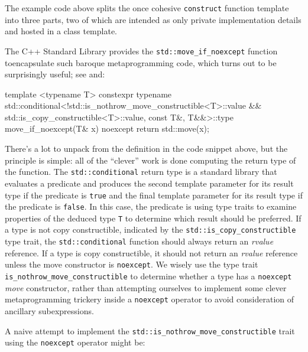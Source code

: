 \noindent The example code above splits the once cohesive \lstinline!construct!
function template into three parts, two of which are intended as only
private implementation details and hosted in a class template.

The C++ Standard Library provides the \lstinline!std::move_if_noexcept!
function to\linebreak[4] encapsulate such baroque metaprogramming code, which turns
out to be surprisingly useful; see  and\linebreak[4]
:

\begin{emcppslisting}
template <typename T>
constexpr
typename std::conditional<!std::is_nothrow_move_constructible<T>::value
                          && std::is_copy_constructible<T>::value,
                          const T&,
                          T&&>::type
move_if_noexcept(T& x) noexcept
{
    return std::move(x);
}
\end{emcppslisting}
    

\noindent There's a lot to unpack from the definition in the code snippet above,
but the principle is simple: all of the ``clever'' work is done
computing the return type of the function. The \lstinline!std::conditional!
return type is a standard library  that evaluates a
predicate and produces the second template parameter for its result type
if the predicate is \lstinline!true! and the final template parameter for
its result type if the predicate is \lstinline!false!. In this case, the
predicate is using type traits to examine properties of the deduced type
\lstinline!T! to determine which result should be preferred. If a type is
not copy constructible, indicated by the
\lstinline!std::is_copy_constructible! type trait, the
\lstinline!std::conditional! function should always return an \emph{rvalue}
reference. If a type is copy constructible, it should not return an
\emph{rvalue} reference unless the move constructor is
\lstinline!noexcept!. We wisely use the type trait
\lstinline!is_nothrow_move_constructible! to determine whether a type
has a \lstinline!noexcept! \emph{move} constructor, rather than attempting
ourselves to implement some clever metaprogramming trickery inside a
\lstinline!noexcept! operator to avoid consideration of ancillary
subexpressions.

A naive attempt to implement the
\lstinline!std::is_nothrow_move_constructible! trait using the
\lstinline!noexcept! operator might be:

